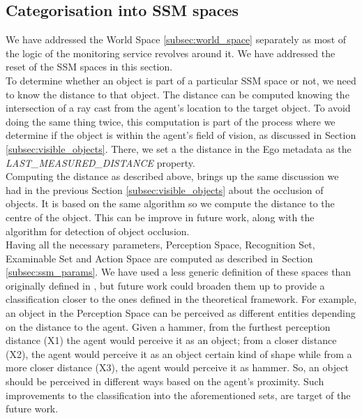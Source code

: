 \subsection{Categorisation into SSM spaces}\label{subsec:categorisation_ssm_spaces}
We have addressed the World Space \ref{subsec:world_space} separately as most of the logic of the monitoring service revolves around it. We have addressed the reset of the SSM spaces in this section.\\

To determine whether an object is part of a particular SSM space or not, we need to know the distance to that object. The distance can be computed knowing the intersection of a ray cast from the agent's location to the target object. To avoid doing the same thing twice, this computation is part of the process where we determine if the object is within the agent's field of vision, as discussed in Section \ref{subsec:visible_objects}. There, we set a the distance in the Ego metadata as the \emph{LAST\_MEASURED\_DISTANCE} property.\\

Computing the distance as described above, brings up the same discussion we had in the previous Section \ref{subsec:visible_objects} about the occlusion of objects. It is based on the same algorithm so we compute the distance to the centre of the object. This can be improve in future work, along with the algorithm for detection of object occlusion.\\

Having all the necessary parameters, Perception Space, Recognition Set, Examinable Set and Action Space are computed as described in Section \ref{subsec:ssm_params}. We have used a less generic definition of these spaces than originally defined in \cite{pederson2011situative}, but future work could broaden them up to provide a classification closer to the ones defined in the theoretical framework. For example, an object in the Perception Space can be perceived as different entities depending on the distance to the agent. Given a hammer, from the furthest perception distance (X1) the agent would perceive it as an object; from a closer distance (X2), the agent would perceive it as an object certain kind of shape while from a more closer distance (X3),  the agent would perceive it as hammer. So, an object should be perceived in different ways based on the agent's proximity. Such improvements to the classification into the aforementioned sets, are target of the future work.\\

